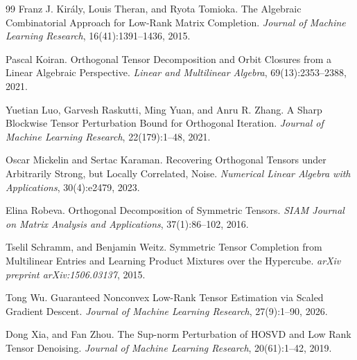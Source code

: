 \begin{thebibliography}{99}
Franz J. Kir\'aly, Louis Theran, and Ryota Tomioka.
The Algebraic Combinatorial Approach for Low-Rank Matrix Completion.
\emph{Journal of Machine Learning Research}, 16(41):1391--1436, 2015.

Pascal Koiran.
Orthogonal Tensor Decomposition and Orbit Closures from a Linear Algebraic Perspective.
\emph{Linear and Multilinear Algebra}, 69(13):2353--2388, 2021.

Yuetian Luo, Garvesh Raskutti, Ming Yuan, and Anru R. Zhang.
A Sharp Blockwise Tensor Perturbation Bound for Orthogonal Iteration.
\emph{Journal of Machine Learning Research}, 22(179):1--48, 2021.

Oscar Mickelin and Sertac Karaman.
Recovering Orthogonal Tensors under Arbitrarily Strong, but Locally Correlated, Noise.
\emph{Numerical Linear Algebra with Applications}, 30(4):e2479, 2023.

Elina Robeva.
Orthogonal Decomposition of Symmetric Tensors.
\emph{SIAM Journal on Matrix Analysis and Applications}, 37(1):86--102, 2016.

Tselil Schramm, and Benjamin Weitz.
Symmetric Tensor Completion from Multilinear Entries and Learning Product Mixtures over the Hypercube.
\emph{arXiv preprint arXiv:1506.03137}, 2015.

Tong Wu.
Guaranteed Nonconvex Low-Rank Tensor Estimation via Scaled Gradient Descent.
\emph{Journal of Machine Learning Research}, 27(9):1--90, 2026.

Dong Xia, and Fan Zhou.
The Sup-norm Perturbation of HOSVD and Low Rank Tensor Denoising.
\emph{Journal of Machine Learning Research}, 20(61):1--42, 2019.
\end{thebibliography}
